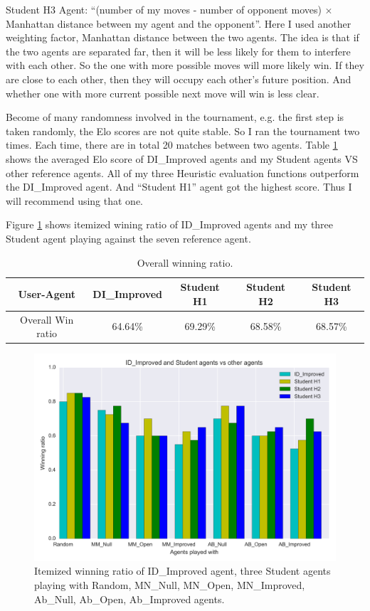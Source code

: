 \documentclass[11pt, letterpaper]{article}
\begin{document}
Student H3 Agent: ``(number of my moves - number of opponent moves) $\times$ Manhattan distance between my agent and the opponent''. Here I used another weighting factor, Manhattan distance between the two agents. The idea is that if the two agents are separated far, then it will be less likely for them to interfere with each other. So the one with more possible moves will more likely win. If they are close to each other, then they will occupy each other's future position. And whether one with more current possible next move will win is less clear.

Become of many randomness involved in the tournament, e.g. the first step is taken randomly, the Elo scores are not quite stable. So I ran the tournament two times. Each time, there are in total 20 matches between two agents. Table \ref{table1} shows the averaged Elo score of DI\_Improved agents and my Student agents VS other reference agents. All of my three Heuristic evaluation functions outperform the DI\_Improved agent. And ``Student H1'' agent got the highest score. Thus I will recommend using that one. 

Figure \ref{figure1} shows itemized wining ratio of ID\_Improved agents and my three Student agent playing against the seven reference agent. 

\begin{table}[h!]
	\centering
	\caption{Overall winning ratio.}
	\label{table1}
	\begin{tabular}{| c | c | c |c |c |}
		\hline
		User-Agent & DI\_Improved & Student H1 & Student H2 & Student H3 \\
		\hline
		Overall Win ratio & 64.64\% &69.29\% & 68.58\% & 68.57\% \\
		\hline
	\end{tabular}
\end{table}

\begin{figure}[h!]
	\centering
	\includegraphics[width=6.5in]{bar_student3agent.png}
	\caption{Itemized winning ratio of ID\_Improved agent, three Student agents playing with Random, MN\_Null, MN\_Open, MN\_Improved, Ab\_Null, Ab\_Open, Ab\_Improved agents.}
	\label{figure1}
\end{figure}
\end{document}
